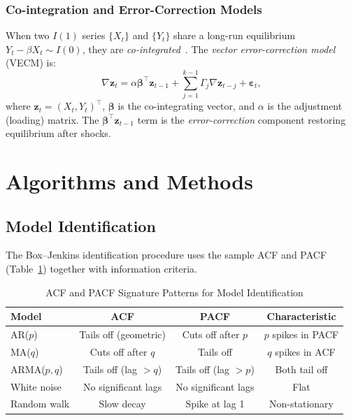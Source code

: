 \documentclass[conference]{IEEEtran}
\theoremstyle{definition}
\begin{document}
\subsubsection{Co-integration and Error-Correction Models}

When two $I(1)$ series $\{X_t\}$ and $\{Y_t\}$ share a long-run equilibrium
$Y_t - \beta X_t \sim I(0)$, they are \emph{co-integrated}~\cite{engle1987co}.
The \emph{vector error-correction model} (VECM) is:
\begin{equation}
  \nabla\mathbf{z}_t
  = \alpha\boldsymbol{\beta}^{\top}\mathbf{z}_{t-1}
  + \sum_{j=1}^{k-1}\Gamma_j\nabla\mathbf{z}_{t-j} + \boldsymbol{\varepsilon}_t,
  \label{eq:vecm}
\end{equation}
where $\mathbf{z}_t = (X_t, Y_t)^{\top}$, $\boldsymbol{\beta}$ is the
co-integrating vector, and $\alpha$ is the adjustment (loading) matrix.
The $\boldsymbol{\beta}^{\top}\mathbf{z}_{t-1}$ term is the
\emph{error-correction} component restoring equilibrium after shocks.

\section{Algorithms and Methods}
\label{sec:algorithms}

\subsection{Model Identification}

The Box--Jenkins identification procedure uses the sample ACF and PACF
(Table~\ref{tab:acf_patterns}) together with information criteria.

\begin{table}[htbp]
\centering
\caption{ACF and PACF Signature Patterns for Model Identification}
\label{tab:acf_patterns}
\begin{tabular}{lccc}
\toprule
\textbf{Model} & \textbf{ACF} & \textbf{PACF} & \textbf{Characteristic}\\
\midrule
AR($p$)    & Tails off (geometric) & Cuts off after $p$ & $p$ spikes in PACF \\
MA($q$)    & Cuts off after $q$    & Tails off          & $q$ spikes in ACF  \\
ARMA($p,q$)& Tails off (lag $>q$)  & Tails off (lag $>p$) & Both tail off     \\
White noise& No significant lags   & No significant lags & Flat              \\
Random walk& Slow decay            & Spike at lag 1     & Non-stationary    \\
\bottomrule
\end{tabular}
\end{table}
\end{document}
